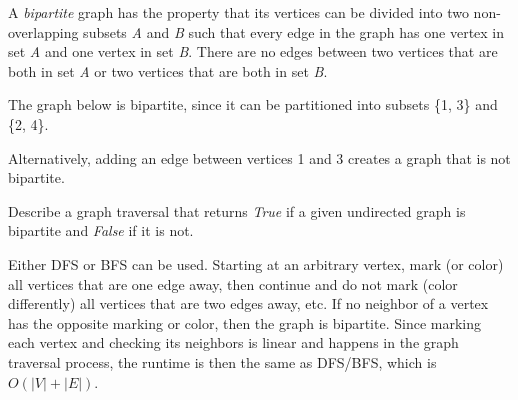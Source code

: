 \begin{blocksection}
\question A \textit{bipartite} graph has the property that its vertices can be divided into two non-overlapping subsets \textit{A} and \textit{B} such that every edge in the graph has one vertex in set \textit{A} and one vertex in set \textit{B}. There are no edges between two vertices that are both in set \textit{A} or two vertices that are both in set \textit{B}.

The graph below is bipartite, since it can be partitioned into subsets \{1, 3\} and \{2, 4\}.
\begin{center}
\end{center}

Alternatively, adding an edge between vertices 1 and 3 creates a graph that is not bipartite.
\begin{center}
\end{center}

Describe a graph traversal that returns \textit{True} if a given undirected graph is bipartite and \textit{False} if it is not.

\begin{solution}
Either DFS or BFS can be used. Starting at an arbitrary vertex, mark (or color) all vertices that are one edge away, then continue and do not mark (color differently) all vertices that are two edges away, etc. If no neighbor of a vertex has the opposite marking or color, then the graph is bipartite.
Since marking each vertex and checking its neighbors is linear and happens in the graph traversal process, the runtime is then the same as DFS/BFS, which is $O(|V| + |E|)$.
\end{solution}
\end{blocksection}